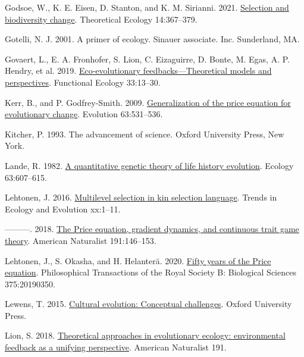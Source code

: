\documentclass[
]{article}
\newlength{\cslhangindent}
\newlength{\cslentryspacingunit} %
\newenvironment{CSLReferences}[2] %
 {%
  \setlength{\parindent}{0pt}
  \ifodd #1
  \let\oldpar\par
  \def\par{\hangindent=\cslhangindent\oldpar}
  \fi
  \setlength{\parskip}{#2\cslentryspacingunit}
 }%
 {}
\begin{document}
\begin{CSLReferences}{0}{0}
\leavevmode{}%
Godsoe, W., K. E. Eisen, D. Stanton, and K. M. Sirianni. 2021.
\href{https://doi.org/10.1007/s12080-020-00478-3}{Selection and
biodiversity change}. Theoretical Ecology 14:367--379.

\leavevmode{}%
Gotelli, N. J. 2001. A primer of ecology. Sinauer associate. Inc.
Sunderland, MA.

\leavevmode{}%
Govaert, L., E. A. Fronhofer, S. Lion, C. Eizaguirre, D. Bonte, M. Egas,
A. P. Hendry, et al. 2019.
\href{https://doi.org/10.1111/1365-2435.13241}{{Eco-evolutionary
feedbacks---Theoretical models and perspectives}}. Functional Ecology
33:13--30.

\leavevmode{}%
Kerr, B., and P. Godfrey-Smith. 2009.
\href{https://doi.org/10.1111/j.1558-5646.2008.00570.x}{{Generalization
of the price equation for evolutionary change}}. Evolution 63:531--536.

\leavevmode{}%
Kitcher, P. 1993. {The advancement of science}. Oxford University Press,
New York.

\leavevmode{}%
Lande, R. 1982. \href{https://doi.org/10.2307/1936778}{{A quantitative
genetic theory of life history evolution}}. Ecology 63:607--615.

\leavevmode{}%
Lehtonen, J. 2016.
\href{https://doi.org/10.1016/j.tree.2016.07.006}{{Multilevel selection
in kin selection language}}. Trends in Ecology and Evolution xx:1--11.

\leavevmode{}%
---------. 2018. \href{https://doi.org/10.1086/694891}{{The Price
equation, gradient dynamics, and continuous trait game theory}}.
American Naturalist 191:146--153.

\leavevmode{}%
Lehtonen, J., S. Okasha, and H. Helanterä. 2020.
\href{https://doi.org/10.1098/rstb.2019.0350}{{Fifty years of the Price
equation}}. Philosophical Transactions of the Royal Society B:
Biological Sciences 375:20190350.

\leavevmode{}%
Lewens, T. 2015.
\href{https://doi.org/10.1093/acprof:oso/9780199674183.001.0001}{Cultural
evolution: Conceptual challenges}. Oxford University Press.

\leavevmode{}%
Lion, S. 2018. \href{https://doi.org/10.1086/694865}{{Theoretical
approaches in evolutionary ecology: environmental feedback as a unifying
perspective}}. American Naturalist 191.


\end{CSLReferences}
\end{document}

